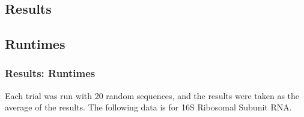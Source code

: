 \documentclass{beamer}
\begin{document}
\begin{frame}
\section{Results}
\subsection{Runtimes}
\frametitle{Results: Runtimes} 
Each trial was run with 20 random sequences, and the results were taken as the average of the results. 
The following data is for 16S Ribosomal Subunit RNA. 
\begin{figure}
\centering
{}
\end{figure}
\end{frame}
\end{document}
